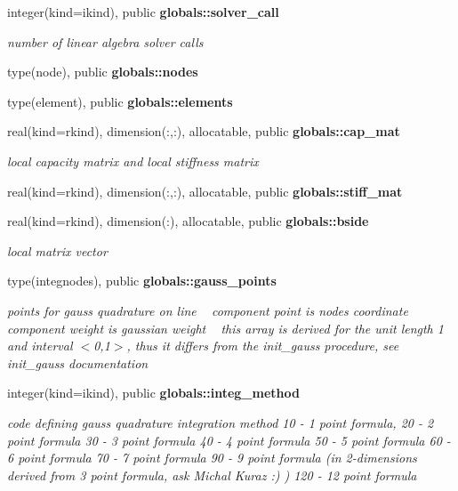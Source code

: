 \begin{DoxyCompactItemize}
integer(kind=ikind), public {\bf globals\+::solver\+\_\+call}
\begin{DoxyCompactList}\small\item\em number of linear algebra solver calls \end{DoxyCompactList}\item 
type(node), public {\bf globals\+::nodes}
\item 
type(element), public {\bf globals\+::elements}
\item 
real(kind=rkind), dimension(\+:,\+:), allocatable, public {\bf globals\+::cap\+\_\+mat}
\begin{DoxyCompactList}\small\item\em local capacity matrix and local stiffness matrix \end{DoxyCompactList}\item 
real(kind=rkind), dimension(\+:,\+:), allocatable, public {\bf globals\+::stiff\+\_\+mat}
\item 
real(kind=rkind), dimension(\+:), allocatable, public {\bf globals\+::bside}
\begin{DoxyCompactList}\small\item\em local matrix vector \end{DoxyCompactList}\item 
type(integnodes), public {\bf globals\+::gauss\+\_\+points}
\begin{DoxyCompactList}\small\item\em points for gauss quadrature on line ~\newline
 component point is node\textquotesingle{}s coordinate ~\newline
 component weight is gaussian weight ~\newline
 this array is derived for the unit length 1 and interval $<$0,1$>$, thus it differs from the init\+\_\+gauss procedure, see init\+\_\+gauss documentation \end{DoxyCompactList}\item 
integer(kind=ikind), public {\bf globals\+::integ\+\_\+method}
\begin{DoxyCompactList}\small\item\em code defining gauss quadrature integration method 10 -\/ 1 point formula, 20 -\/ 2 point formula 30 -\/ 3 point formula 40 -\/ 4 point formula 50 -\/ 5 point formula 60 -\/ 6 point formula 70 -\/ 7 point formula 90 -\/ 9 point formula (in 2-\/dimensions derived from 3 point formula, ask Michal Kuraz \+:) ) 120 -\/ 12 point formula \end{DoxyCompactList}\item 

\end{DoxyCompactItemize}
